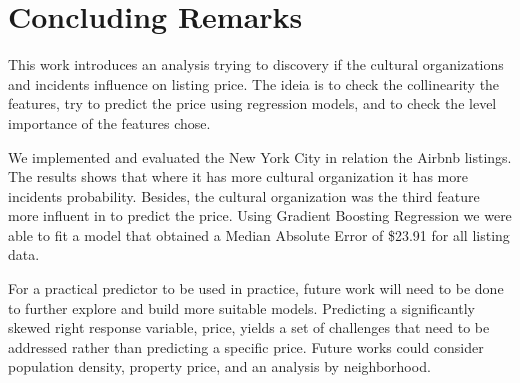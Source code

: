 \documentclass[sigconf]{acmart}
\begin{document}
\section{Concluding Remarks}
\label{sec:conclusion}

This work introduces an analysis trying to discovery if the cultural organizations and incidents influence on listing price. The ideia is to check the collinearity the features, try to predict the price using regression models, and to check the level importance of the features chose. 

We implemented and evaluated the New York City in relation the Airbnb listings. The results shows that where it has more cultural organization it has more incidents probability. Besides, the cultural organization was the third feature more influent in to predict the price. Using Gradient Boosting Regression we were able to fit a model that obtained a Median Absolute Error of \$23.91 for all listing data. 

For a practical predictor to be used in practice, future work will need to be done to further explore and build more suitable models. Predicting a significantly skewed right response variable, price, yields a set of challenges that need to be addressed rather than predicting a specific price. Future works could consider population density, property price, and an analysis by neighborhood.

\balance

 
\end{document}
